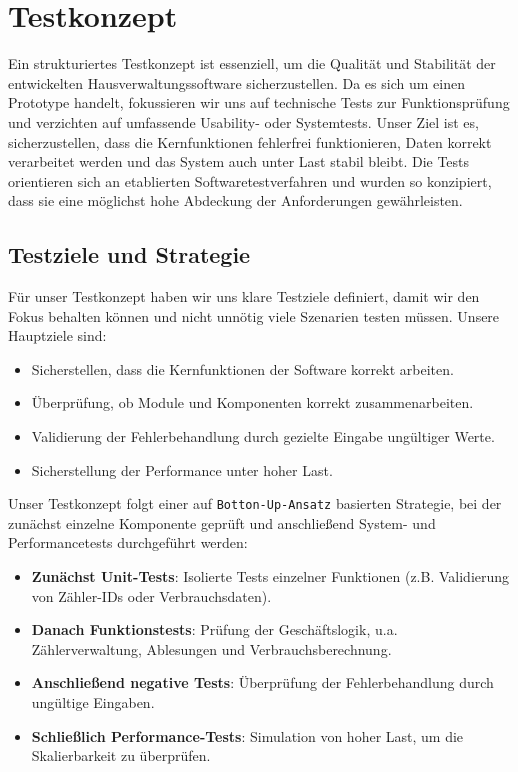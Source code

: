 \newpage
\section{Testkonzept}\label{sec:testkonzept}

Ein strukturiertes Testkonzept ist essenziell, um die Qualität und Stabilität der entwickelten Hausverwaltungssoftware sicherzustellen.  
Da es sich um einen Prototype handelt, fokussieren wir uns auf technische Tests zur Funktionsprüfung und verzichten auf umfassende Usability- oder Systemtests.  
Unser Ziel ist es, sicherzustellen, dass die Kernfunktionen fehlerfrei funktionieren, Daten korrekt verarbeitet werden und das System auch unter Last stabil bleibt.
Die Tests orientieren sich an etablierten Softwaretestverfahren und wurden so konzipiert, dass sie eine möglichst hohe Abdeckung der Anforderungen gewährleisten.

\subsection{Testziele und Strategie}\label{subsec:testziele-und-strategie}

Für unser Testkonzept haben wir uns klare Testziele definiert, damit wir den Fokus behalten können und nicht unnötig viele Szenarien testen müssen.
Unsere Hauptziele sind:
\begin{itemize}
	\item Sicherstellen, dass die Kernfunktionen der Software korrekt arbeiten.
	\item Überprüfung, ob Module und Komponenten korrekt zusammenarbeiten.
	\item Validierung der Fehlerbehandlung durch gezielte Eingabe ungültiger Werte.
	\item Sicherstellung der Performance unter hoher Last.
\end{itemize}

Unser Testkonzept folgt einer auf \texttt{Botton-Up-Ansatz} basierten Strategie, bei der zunächst einzelne Komponente geprüft und anschließend System- und Performancetests durchgeführt werden:\par
\begin{itemize}
	\item \textbf{Zunächst Unit-Tests}: Isolierte Tests einzelner Funktionen (z.B. Validierung von Zähler-IDs oder Verbrauchsdaten).
	\item \textbf{Danach Funktionstests}: Prüfung der Geschäftslogik, u.a. Zählerverwaltung, Ablesungen und Verbrauchsberechnung.
	\item \textbf{Anschließend negative Tests}: Überprüfung der Fehlerbehandlung durch ungültige Eingaben.
	\item \textbf{Schließlich Performance-Tests}: Simulation von hoher Last, um die Skalierbarkeit zu überprüfen.
\end{itemize}

